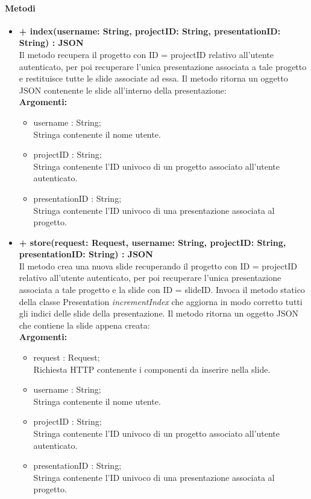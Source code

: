 	\paragraph{Metodi}
		\begin{itemize}
			\item \textbf{+ index(username: String, projectID: String, presentationID: String) : \gls{JSON}}\\
				Il metodo recupera il progetto con ID = projectID relativo all'utente autenticato, per poi recuperare l'unica presentazione associata a tale progetto e restituisce tutte le \gls{slide} associate ad essa. Il metodo ritorna un oggetto \gls{JSON} contenente le \gls{slide} all'interno della presentazione:\\
				\textbf{Argomenti:}
				\begin{itemize}
					\item username : String; \\
					Stringa contenente il nome utente.
					\item projectID : String; \\
					Stringa contenente l'ID univoco di un progetto associato all'utente autenticato.
					\item presentationID : String; \\
					Stringa contenente l'ID univoco di una presentazione associata al progetto.
				\end{itemize}
				
			\item \textbf{+ store(request: Request, username: String, projectID: String, presentationID: String) : \gls{JSON}}\\
				Il metodo crea una nuova \gls{slide} recuperando il progetto con ID = projectID relativo all'utente autenticato, per poi recuperare l'unica presentazione associata a tale progetto e la \gls{slide} con ID = slideID. Invoca il metodo statico della classe Presentation \textit{incrementIndex} che aggiorna in modo corretto tutti gli indici delle \gls{slide} della presentazione. Il metodo ritorna un oggetto \gls{JSON} che contiene la \gls{slide} appena creata:\\
				\textbf{Argomenti:}
				\begin{itemize}
					\item request : Request;\\
					Richiesta HTTP contenente i componenti da inserire nella \gls{slide}.
					\item username : String; \\
					Stringa contenente il nome utente.
					\item projectID : String; \\
					Stringa contenente l'ID univoco di un progetto associato all'utente autenticato.
					\item presentationID : String; \\
					Stringa contenente l'ID univoco di una presentazione associata al progetto.
				\end{itemize}
			

\end{itemize}
